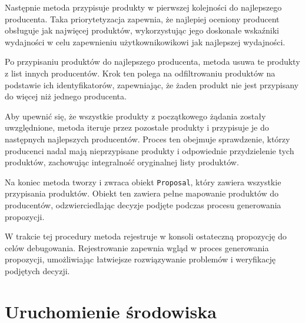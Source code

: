 \begin{itemize}
    Następnie metoda przypisuje produkty w pierwszej kolejności do najlepszego producenta. Taka priorytetyzacja zapewnia, że najlepiej oceniony producent obsługuje jak najwięcej produktów, wykorzystując jego doskonałe wskaźniki wydajności w celu zapewnieniu użytkownikowikowi jak najlepszej wydajności.

    Po przypisaniu produktów do najlepszego producenta, metoda usuwa te produkty z list innych producentów. Krok ten polega na odfiltrowaniu produktów na podstawie ich identyfikatorów, zapewniając, że żaden produkt nie jest przypisany do więcej niż jednego producenta.

    Aby upewnić się, że wszystkie produkty z początkowego żądania zostały uwzględnione, metoda iteruje przez pozostałe produkty i przypisuje je do następnych najlepszych producentów. Proces ten obejmuje sprawdzenie, którzy producenci nadal mają nieprzypisane produkty i odpowiednie przydzielenie tych produktów, zachowując integralność oryginalnej listy produktów.
    
    Na koniec metoda tworzy i zwraca obiekt \verb|Proposal|, który zawiera wszystkie przypisania produktów. Obiekt ten zawiera pełne mapowanie produktów do producentów, odzwierciedlając decyzje podjęte podczas procesu generowania propozycji.

    W trakcie tej procedury metoda rejestruje w konsoli ostateczną propozycję do celów debugowania. Rejestrowanie zapewnia wgląd w proces generowania propozycji, umożliwiając łatwiejsze rozwiązywanie problemów i weryfikację podjętych decyzji.
\end{itemize}
\section{Uruchomienie środowiska}